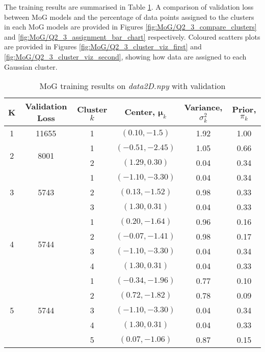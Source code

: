 \documentclass[a4paper,12pt]{article}
\begin{document}
The training results are summarised in Table \ref{tab:MoG/Q2_3_results}. A comparison of validation loss between MoG models and the percentage of data points assigned to the clusters in each MoG models are provided in Figures \ref{fig:MoG/Q2_3_compare_clusters} and \ref{fig:MoG/Q2_3_assignment_bar_chart} respectively. Coloured scatters plots are provided in Figures \ref{fig:MoG/Q2_3_cluster_viz_first} and \ref{fig:MoG/Q2_3_cluster_viz_second}, showing how data are assigned to each Gaussian cluster.

\begin{table}[!htb]
\centering
\caption{MoG training results on \textit{data2D.npy} with validation}
\label{tab:MoG/Q2_3_results}
\vspace{1em}
\begin{tabular}{|c|c|c|c|c|c|} \hline
K & Validation Loss & Cluster $k$ & Center, $\bm{\mu}_k$ & Variance, $\sigma_k^2$ & Prior, $\pi_k$  \\ \hline
1 & 11655 & 1 & $(0.10, -1.5)$ & 1.92 & 1.00 \\ \hline
\multirow{2}{*}{2} & \multirow{2}{*}{8001} 
	& 1 & $(-0.51, -2.45)$ & 1.05 & 0.66 \\
    & & 2 & $(1.29, 0.30)$ & 0.04 & 0.34 \\ \hline
\multirow{3}{*}{3} & \multirow{3}{*}{5743} 
	& 1 & $(-1.10, -3.30)$ & 0.04 & 0.34 \\ 
    & & 2 & $(0.13, -1.52)$ & 0.98 & 0.33 \\ 
    & & 3 & $(1.30, 0.31)$ & 0.04 & 0.33 \\ \hline
\multirow{4}{*}{4} & \multirow{4}{*}{5744} 
	& 1 & $(0.20, -1.64)$ & 0.96 & 0.16 \\ 
    & & 2 & $(-0.07, -1.41)$ & 0.98 & 0.17 \\ 
    & & 3 & $(-1.10, -3.30)$ & 0.04 & 0.34 \\
    & & 4 & $(1.30, 0.31)$ & 0.04 & 0.33 \\ \hline
\multirow{5}{*}{5} & \multirow{5}{*}{5744} 
	& 1 & $(-0.34, -1.96)$ & 0.77 & 0.10 \\ 
    & & 2 & $(0.72, -1.82)$ & 0.78 & 0.09 \\ 
    & & 3 & $(-1.10, -3.30)$ & 0.04 & 0.34 \\
    & & 4 & $(1.30, 0.31)$ & 0.04 & 0.33 \\
    & & 5 & $(0.07, -1.06)$ & 0.87 & 0.15 \\ \hline
\end{tabular}
\end{table}
\end{document}
